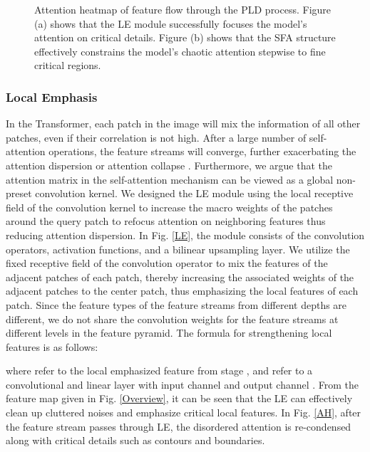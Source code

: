 \documentclass[runningheads]{llncs}
\begin{document}
\begin{figure}[!h]
    \centering
    \label{attention map}
    \caption{Attention heatmap of feature flow through the PLD process. Figure (a) shows that the LE module successfully focuses the model's attention on critical details. Figure (b) shows that the SFA structure effectively constrains the model's chaotic attention stepwise to fine critical regions.}
\end{figure}



\subsubsection{Local Emphasis}
In the Transformer, each patch in the image will mix the information of all other patches, even if their correlation is not high. After a large number of self-attention operations, the feature streams will converge, further exacerbating the attention dispersion or attention collapse \cite{zhou2021deepvit}. Furthermore, we argue that the attention matrix in the self-attention mechanism can be viewed as a global non-preset convolution kernel. We designed the LE module using the local receptive field of the convolution kernel to increase the macro weights of the patches around the query patch to refocus attention on neighboring features thus reducing attention dispersion. In Fig. \ref{LE}, the module consists of the convolution operators, activation functions, and a bilinear upsampling layer. We utilize the fixed receptive field of the convolution operator to mix the features of the adjacent patches of each patch, thereby increasing the associated weights of the adjacent patches to the center patch, thus emphasizing the local features of each patch. Since the feature types of the feature streams from different depths are different, we do not share the convolution weights for the feature streams at different levels in the feature pyramid. The formula for strengthening local features is as follows:

where  refer to the local emphasized feature from stage ,  and  refer to a convolutional and linear layer with input channel  and output channel . From the feature map given in Fig. \ref{Overview}, it can be seen that the LE can effectively clean up cluttered noises and emphasize critical local features. In Fig. \ref{AH}, after the feature stream passes through LE, the disordered attention is re-condensed along with critical details such as contours and boundaries.
\end{document}

